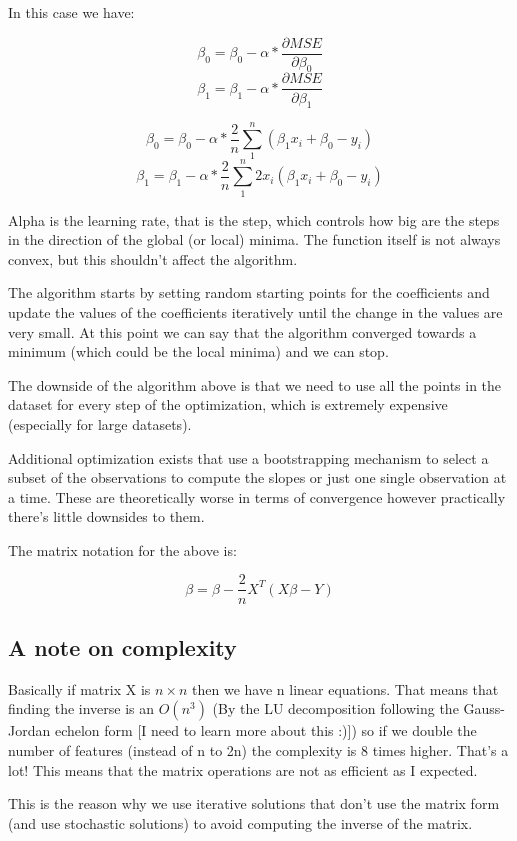 \documentclass[12pt,a4paper]{article}
\begin{document}
In this case we have: 

$$\beta_{0} = \beta_{0} - \alpha * \frac{\partial{MSE}}{\partial{\beta_{0}}}$$
$$\beta_{1} = \beta_{1} - \alpha * \frac{\partial{MSE}}{\partial{\beta_{1}}}$$

$$\beta_{0} = \beta_{0} - \alpha * \frac{2}{n} \sum_{1}^{n}(\beta_{1}x_{i} + \beta_{0} - y_{i})$$
$$\beta_{1} = \beta_{1} - \alpha * \frac{2}{n} \sum_{1}^{n}2x_{i}(\beta_{1}x_{i} + \beta_{0} - y_{i})$$

Alpha is the learning rate, that is the step, which controls how big are the steps in the direction of the global (or local) minima. The function itself is not always convex, but this shouldn't affect the algorithm. 

The algorithm starts by setting random starting points for the coefficients and update the values of the coefficients iteratively until the change in the values are very small. At this point we can say that the algorithm converged towards a minimum (which could be the local minima) and we can stop.

The downside of the algorithm above is that we need to use all the points in the dataset for every step of the optimization, which is extremely expensive (especially for large datasets). 

Additional optimization exists that use a bootstrapping mechanism to select a subset of the observations to compute the slopes or just one single observation at a time. These are theoretically worse in terms of convergence however practically there's little downsides to them.

The matrix notation for the above is:

$$\beta = \beta - \frac{2}{n}X^{T}(X\beta - Y)$$

\subsection{A note on complexity}
Basically if matrix X is $n \times n$ then we have n linear equations. That means that finding the inverse is an $O(n^3)$ (By the LU decomposition following the Gauss-Jordan echelon form [I need to learn more about this :)]) so if we double the number of features (instead of n to 2n) the complexity is 8 times higher. That's a lot! This means that the matrix operations are not as efficient as I expected.

This is the reason why we use iterative solutions that don't use the matrix form (and use stochastic solutions) to avoid computing the inverse of the matrix.
\end{document}
